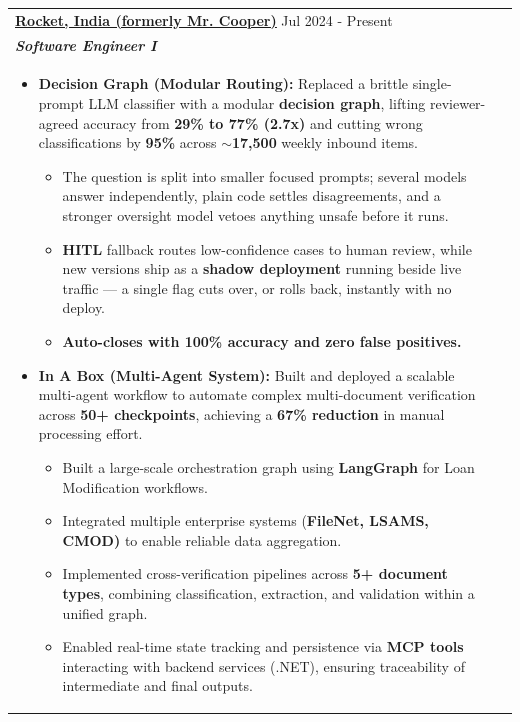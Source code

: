 \documentclass[a4paper,10pt]{article}
\begin{document}
    \begin{tabularx}{\linewidth}{ @{}l r@{} }
    \href{https://www.linkedin.com/company/mrcoopermortgage}
    {\underline{\textbf{Rocket, India (formerly Mr. Cooper)}}} \hfill \color[HTML]{371e77} Jul 2024 - Present \\[4pt]
    \color[HTML]{371e77}\textbf{\textit{Software Engineer I}} \hfill \\[3pt]
    \begin{minipage}[t]{\linewidth}
    \begin{itemize}[nosep,after=\strut, leftmargin=2em, itemsep=2pt]
        \item \textbf{Decision Graph (Modular Routing):} Replaced a brittle single-prompt LLM classifier with a modular \textbf{decision graph}, lifting reviewer-agreed accuracy from \textbf{29\% to 77\% (2.7x)} and cutting wrong classifications by \textbf{95\%} across \textbf{$\sim$17,500} weekly inbound items.
            \begin{itemize}
                \item The question is split into smaller focused prompts; several models answer independently, plain code settles disagreements, and a stronger oversight model vetoes anything unsafe before it runs.
                \item \textbf{HITL} fallback routes low-confidence cases to human review, while new versions ship as a \textbf{shadow deployment} running beside live traffic — a single flag cuts over, or rolls back, instantly with no deploy.
                \item \textbf{Auto-closes with 100\% accuracy and zero false positives.}
            \end{itemize}
        
        \item \textbf{In A Box (Multi-Agent System):} Built and deployed a scalable multi-agent workflow to automate complex multi-document verification across \textbf{50+ checkpoints}, achieving a \textbf{67\% reduction} in manual processing effort.
            \begin{itemize}
                \item Built a large-scale orchestration graph using \textbf{LangGraph} for Loan Modification workflows.
                \item Integrated multiple enterprise systems (\textbf{FileNet, LSAMS, CMOD)} to enable reliable data aggregation.
                \item Implemented cross-verification pipelines across \textbf{5+ document types}, combining classification, extraction, and validation within a unified graph.
                \item Enabled real-time state tracking and persistence via \textbf{MCP tools} interacting with backend services (.NET), ensuring traceability of intermediate and final outputs.
            \end{itemize}
        

\end{itemize}
\end{minipage}
\end{tabularx}
\end{document}
